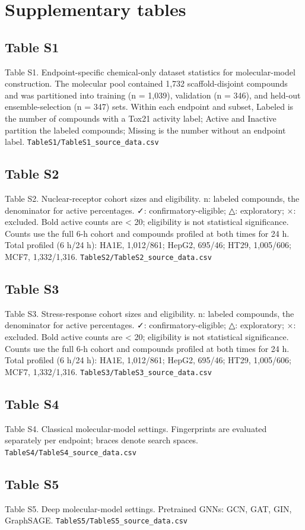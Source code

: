 \documentclass{article}
\begin{document}
\section*{Supplementary tables}
\subsection*{Table S1}
Table S1. Endpoint-specific chemical-only dataset statistics for molecular-model construction. The molecular pool contained 1,732 scaffold-disjoint compounds and was partitioned into training (n = 1,039), validation (n = 346), and held-out ensemble-selection (n = 347) sets. Within each endpoint and subset, Labeled is the number of compounds with a Tox21 activity label; Active and Inactive partition the labeled compounds; Missing is the number without an endpoint label.
\texttt{TableS1/TableS1_source_data.csv}
\subsection*{Table S2}
Table S2. Nuclear-receptor cohort sizes and eligibility. n: labeled compounds, the denominator for active percentages. ✓: confirmatory-eligible; △: exploratory; ×: excluded. Bold active counts are < 20; eligibility is not statistical significance. Counts use the full 6-h cohort and compounds profiled at both times for 24 h. Total profiled (6 h/24 h): HA1E, 1,012/861; HepG2, 695/46; HT29, 1,005/606; MCF7, 1,332/1,316.
\texttt{TableS2/TableS2_source_data.csv}
\subsection*{Table S3}
Table S3. Stress-response cohort sizes and eligibility. n: labeled compounds, the denominator for active percentages. ✓: confirmatory-eligible; △: exploratory; ×: excluded. Bold active counts are < 20; eligibility is not statistical significance. Counts use the full 6-h cohort and compounds profiled at both times for 24 h. Total profiled (6 h/24 h): HA1E, 1,012/861; HepG2, 695/46; HT29, 1,005/606; MCF7, 1,332/1,316.
\texttt{TableS3/TableS3_source_data.csv}
\subsection*{Table S4}
Table S4. Classical molecular-model settings. Fingerprints are evaluated separately per endpoint; braces denote search spaces.
\texttt{TableS4/TableS4_source_data.csv}
\subsection*{Table S5}
Table S5. Deep molecular-model settings. Pretrained GNNs: GCN, GAT, GIN, GraphSAGE.
\texttt{TableS5/TableS5_source_data.csv}
\end{document}
